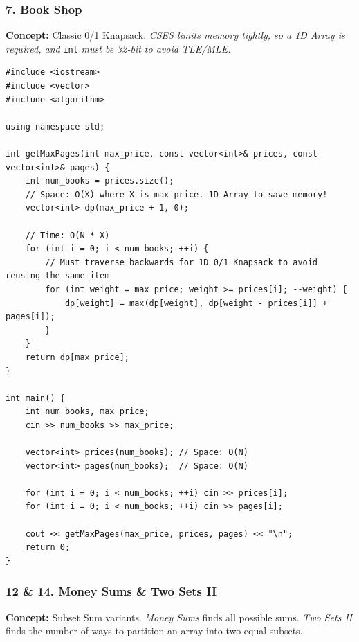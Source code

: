 \subsubsection{7. Book Shop}
\textbf{Concept:} Classic 0/1 Knapsack. \textit{CSES limits memory tightly, so a 1D Array is required, and} \texttt{int} \textit{must be 32-bit to avoid TLE/MLE.}

\begin{lstlisting}
#include <iostream>
#include <vector>
#include <algorithm>

using namespace std;

int getMaxPages(int max_price, const vector<int>& prices, const vector<int>& pages) {
    int num_books = prices.size();
    // Space: O(X) where X is max_price. 1D Array to save memory!
    vector<int> dp(max_price + 1, 0); 
    
    // Time: O(N * X)
    for (int i = 0; i < num_books; ++i) {
        // Must traverse backwards for 1D 0/1 Knapsack to avoid reusing the same item
        for (int weight = max_price; weight >= prices[i]; --weight) {
            dp[weight] = max(dp[weight], dp[weight - prices[i]] + pages[i]);
        }
    }
    return dp[max_price];
}

int main() {
    int num_books, max_price; 
    cin >> num_books >> max_price;
    
    vector<int> prices(num_books); // Space: O(N)
    vector<int> pages(num_books);  // Space: O(N)
    
    for (int i = 0; i < num_books; ++i) cin >> prices[i];
    for (int i = 0; i < num_books; ++i) cin >> pages[i];
    
    cout << getMaxPages(max_price, prices, pages) << "\n";
    return 0;
}
\end{lstlisting}

\subsubsection{12 \& 14. Money Sums \& Two Sets II}
\textbf{Concept:} Subset Sum variants. \textit{Money Sums} finds all possible sums. \textit{Two Sets II} finds the number of ways to partition an array into two equal subsets.

